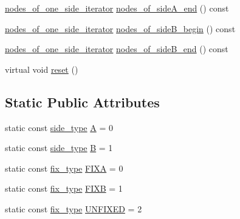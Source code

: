 \begin{DoxyCompactItemize}
\mbox{\hyperlink{classratio__cut__partition_af438a591f6559b479bf40e9ac9cfcf0e}{nodes\+\_\+of\+\_\+one\+\_\+side\+\_\+iterator}} \mbox{\hyperlink{classratio__cut__partition_a497d63a55cf326f62b97d0c77be094c7}{nodes\+\_\+of\+\_\+side\+A\+\_\+end}} () const
\item 
\mbox{\hyperlink{classratio__cut__partition_af438a591f6559b479bf40e9ac9cfcf0e}{nodes\+\_\+of\+\_\+one\+\_\+side\+\_\+iterator}} \mbox{\hyperlink{classratio__cut__partition_ae36c08387ff6eae1236076cdbabf4fa5}{nodes\+\_\+of\+\_\+side\+B\+\_\+begin}} () const
\item 
\mbox{\hyperlink{classratio__cut__partition_af438a591f6559b479bf40e9ac9cfcf0e}{nodes\+\_\+of\+\_\+one\+\_\+side\+\_\+iterator}} \mbox{\hyperlink{classratio__cut__partition_a838e3ab6d00155c1f3868cc920a4a8f6}{nodes\+\_\+of\+\_\+side\+B\+\_\+end}} () const
\item 
virtual void \mbox{\hyperlink{classratio__cut__partition_ad017eaf98f9ae4ca9dbe6b3eda9fc94d}{reset}} ()
\end{DoxyCompactItemize}
\subsection*{Static Public Attributes}
\begin{DoxyCompactItemize}
\item 
static const \mbox{\hyperlink{classratio__cut__partition_ace53442bd0c1e21fbf00858ec6f6b456}{side\+\_\+type}} \mbox{\hyperlink{classratio__cut__partition_a9c0da5ad845b01bddbc1f238fa35cdd0}{A}} = 0
\item 
static const \mbox{\hyperlink{classratio__cut__partition_ace53442bd0c1e21fbf00858ec6f6b456}{side\+\_\+type}} \mbox{\hyperlink{classratio__cut__partition_adf075987228d8adc7950d5b1ba332daa}{B}} = 1
\item 
static const \mbox{\hyperlink{classratio__cut__partition_a558dda40abda8ab03edb4605dbb81e36}{fix\+\_\+type}} \mbox{\hyperlink{classratio__cut__partition_a2fe155c63de19dc08c16bcb382f0dcbc}{F\+I\+XA}} = 0
\item 
static const \mbox{\hyperlink{classratio__cut__partition_a558dda40abda8ab03edb4605dbb81e36}{fix\+\_\+type}} \mbox{\hyperlink{classratio__cut__partition_aea621a2460229773cbc095814942963a}{F\+I\+XB}} = 1
\item 
static const \mbox{\hyperlink{classratio__cut__partition_a558dda40abda8ab03edb4605dbb81e36}{fix\+\_\+type}} \mbox{\hyperlink{classratio__cut__partition_a153cc7e51ac5d72a00671b6bdbcc6fa5}{U\+N\+F\+I\+X\+ED}} = 2
\end{DoxyCompactItemize}
